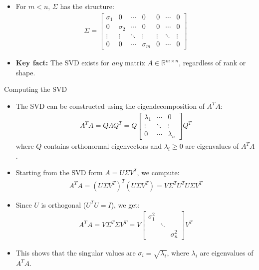 \begin{frame}{}
\begin{itemize}
    \item For $m < n$, $\Sigma$ has the structure:
    \begin{align}
        \Sigma = \begin{bmatrix}
            \sigma_1 & 0 & \cdots & 0 & 0 & \cdots & 0 \\
            0 & \sigma_2 & \cdots & 0 & 0 & \cdots & 0\\
            \vdots & \vdots & \ddots & \vdots & \vdots & \ddots & \vdots \\
            0 & 0 & \cdots & \sigma_m & 0 & \cdots & 0
        \end{bmatrix}
    \end{align}
    \item \textbf{Key fact:} The SVD exists for \emph{any} matrix $A \in \mathbb{R}^{m \times n}$, regardless of rank or shape.
\end{itemize}
\end{frame}

\begin{frame}{Computing the SVD}
\begin{itemize}
    \item The SVD can be constructed using the eigendecomposition of $A^TA$:
    \begin{align}
        A^TA = Q\Lambda Q^T = Q \begin{bmatrix}
            \lambda_1 & \cdots & 0\\
            \vdots & \ddots & \vdots\\
            0 & \cdots & \lambda_n
        \end{bmatrix} Q^T
    \end{align}
    where $Q$ contains orthonormal eigenvectors and $\lambda_i \geq 0$ are eigenvalues of $A^TA$.
    \item Starting from the SVD form $A = U\Sigma V^T$, we compute:
    \begin{align}
        A^TA = (U\Sigma V^T)^T (U\Sigma V^T) = V\Sigma^T U^T U \Sigma V^T
    \end{align}
\end{itemize}
\end{frame}

\begin{frame}{}
\begin{itemize}
    \item Since $U$ is orthogonal ($U^TU = I$), we get:
    \begin{align}
        A^TA = V\Sigma^T \Sigma V^T = V \begin{bmatrix}
            \sigma_1^2 & & \\
            & \ddots & \\
            & & \sigma_n^2
        \end{bmatrix} V^T
    \end{align}
    \item This shows that the singular values are $\sigma_i = \sqrt{\lambda_i}$, where $\lambda_i$ are eigenvalues of $A^TA$.
\end{itemize}
\end{frame}